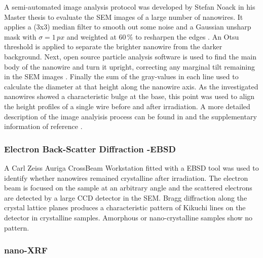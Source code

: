 A semi-automated image analysis protocol was developed by Stefan Noack in his Master thesis \cite{noack_sputter_2014, NL} to evaluate the SEM images of a large number of nanowires. It applies a (3x3) median filter to smooth out some noise and a Gaussian unsharp mask with $\sigma = 1\,px$ and weighted at $60\,\%$ to resharpen the edges \cite{sankur_survey_2004}. An Otsu threshold \cite{otsu_threshold_1979} is applied to separate the brighter nanowire from the darker background. Next, open source particle analysis software is used to find the main body of the nanowire and turn it upright, correcting any marginal tilt remaining in the SEM images \cite{schindelin_fiji:_2012,sage_imagej_2012}. Finally the sum of the gray-values in each line used to calculate the diameter at that height along the nanowire axis. As the investigated nanowires showed a characteristic bulge at the base, this point was used to align the height profiles of a single wire before and after irradiation. A more detailed description of the image analyisis process can be found in \cite{noack_sputter_2014} and the supplementary information of reference \cite{NL}.

\subsubsection{Electron Back-Scatter Diffraction -EBSD}

A Carl Zeiss Auriga CrossBeam Workstation fitted with a EBSD tool was used to identify whether nanowires remained crystalline after irradiation. The electron beam is focused on the sample at an arbitrary angle and the scattered electrons are detected by a large CCD detector in the SEM. Bragg diffraction along the crystal lattice planes produces a characteristic pattern of Kikuchi lines on the detector \cite{kikuchi_diffraction_1928,fultz_transmission_2013} in crystalline samples. Amorphous or nano-crystalline samples show no pattern.

\subsubsection{nano-XRF}

